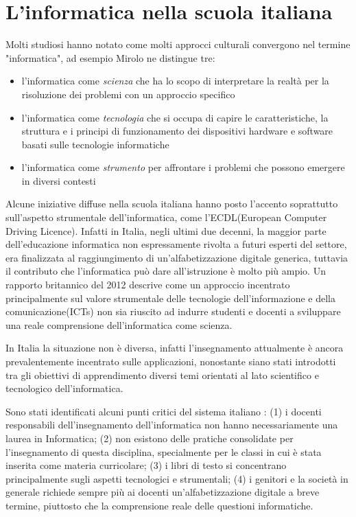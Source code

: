 \documentclass[12pt]{report}
\begin{document}
%
\section{L'informatica nella scuola italiana}
%
Molti studiosi hanno notato come molti approcci culturali convergono nel termine "informatica", ad esempio Mirolo \cite{Mirolo2003} ne distingue tre:
\begin{itemize}
	\item l'informatica come \textit{scienza} che ha lo scopo di interpretare la realtà per la risoluzione dei problemi con un approccio specifico
	\item l'informatica come \textit{tecnologia} che si occupa di capire le caratteristiche, la struttura e i principi di funzionamento dei dispositivi hardware e software basati sulle tecnologie informatiche
	\item l'informatica come \textit{strumento} per affrontare i problemi che possono emergere in diversi contesti
\end{itemize} 

Alcune iniziative diffuse nella scuola italiana hanno posto l'accento soprattutto sull'aspetto strumentale dell'informatica, come l'ECDL(European Computer Driving Licence). Infatti in Italia, negli ultimi due decenni, la maggior parte dell'educazione informatica non espressamente rivolta a futuri esperti del settore, era finalizzata al raggiungimento di un'alfabetizzazione digitale generica, tuttavia il contributo che l'informatica può dare all'istruzione è molto più ampio.
Un rapporto britannico del 2012 \cite{RoyalSociety2012} descrive come un approccio incentrato principalmente sul valore strumentale delle tecnologie dell'informazione e della comunicazione(ICTs) non sia riuscito ad indurre studenti e docenti a sviluppare una reale comprensione dell'informatica come scienza. 

In Italia la situazione non è diversa, infatti l'insegnamento attualmente è ancora prevalentemente incentrato sulle applicazioni, nonostante siano stati introdotti tra gli obiettivi di apprendimento diversi temi orientati al lato scientifico e tecnologico dell'informatica.

Sono stati identificati alcuni punti critici del sistema italiano \cite{BellettiniTOCE2014}: (1) i docenti responsabili dell'insegnamento dell'informatica non hanno necessariamente una laurea in Informatica; (2) non esistono delle pratiche consolidate per l'insegnamento di questa disciplina, specialmente per le classi in cui è stata inserita come materia curricolare; (3) i libri di testo si concentrano principalmente sugli aspetti tecnologici e strumentali; (4) i genitori e la società in generale richiede sempre più ai docenti un'alfabetizzazione digitale a breve termine, piuttosto che la comprensione reale delle questioni informatiche.
\\
\end{document}
